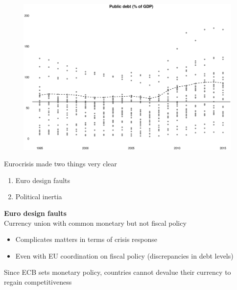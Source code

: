 \documentclass{beamer}
\begin{document}
\begin{frame}
  \begin{figure}
    \includegraphics[scale=.3]{public_debt2.eps}
  \end{figure}
\end{frame}

\begin{frame}
  Eurocrisis made two things very clear
  \begin{enumerate}    
    \item Euro design faults
    \item Political inertia
  \end{enumerate}
\end{frame}

\begin{frame}
  \textbf{Euro design faults}\\
  Currency union with common monetary but not fiscal policy
  \begin{itemize}
    \item Complicates matters in terms of crisis response
    \item Even with EU coordination on fiscal policy (discrepancies in debt levels)
  \end{itemize}
  \medskip
  Since ECB sets monetary policy, countries cannot devalue their currency to regain competitiveness 
\end{frame}
\end{document}
